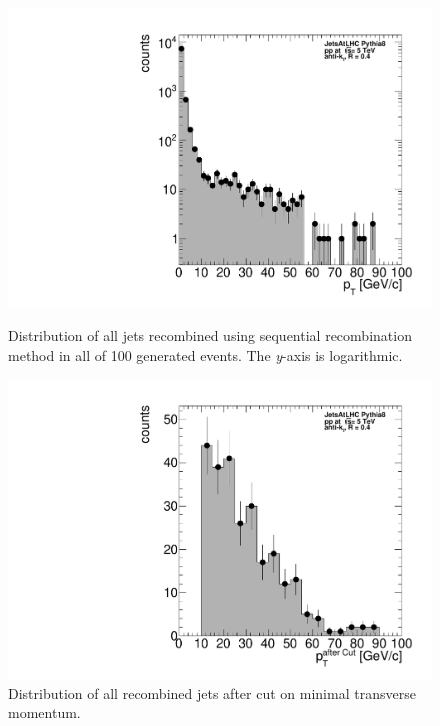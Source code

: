 \documentclass[a4paper,10pt]{article}
\begin{document}
\begin{figure}[htbp]
    \centering
    \begin{minipage}{0.45\textwidth}
        \centering
        \includegraphics[width=\textwidth]{figures/hJetPt.pdf}
        \caption{Distribution of all jets recombined using sequential recombination method in all of 100 generated events. The \textit{y}-axis is logarithmic.}
        \label{f1}
    \end{minipage}\hfill
    \begin{minipage}{0.45\textwidth}
        \centering
        \includegraphics[width=\textwidth]{figures/hJetPtCut.pdf}
        \caption{Distribution of all recombined jets after cut on minimal transverse momentum. }
        \label{f2}
    \end{minipage}
\end{figure}
\end{document}
